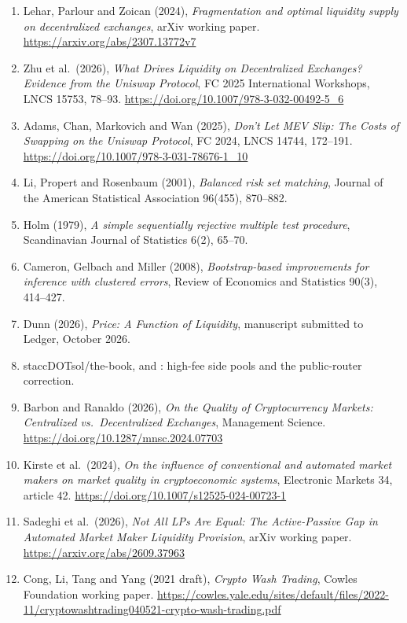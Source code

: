 \documentclass{ledger}
\begin{document}
\begin{enumerate}
\item Lehar, Parlour and Zoican (2024), \emph{Fragmentation and optimal liquidity supply on decentralized exchanges}, arXiv working paper. \url{https://arxiv.org/abs/2307.13772v7}
\item Zhu et al.\ (2026), \emph{What Drives Liquidity on Decentralized Exchanges? Evidence from the Uniswap Protocol}, FC 2025 International Workshops, LNCS 15753, 78--93. \url{https://doi.org/10.1007/978-3-032-00492-5_6}
\item Adams, Chan, Markovich and Wan (2025), \emph{Don't Let MEV Slip: The Costs of Swapping on the Uniswap Protocol}, FC 2024, LNCS 14744, 172--191. \url{https://doi.org/10.1007/978-3-031-78676-1_10}
\item Li, Propert and Rosenbaum (2001), \emph{Balanced risk set matching}, Journal of the American Statistical Association 96(455), 870--882.
\item Holm (1979), \emph{A simple sequentially rejective multiple test procedure}, Scandinavian Journal of Statistics 6(2), 65--70.
\item Cameron, Gelbach and Miller (2008), \emph{Bootstrap-based improvements for inference with clustered errors}, Review of Economics and Statistics 90(3), 414--427.
\item Dunn (2026), \emph{Price: A Function of Liquidity}, manuscript submitted to Ledger, October 2026.
\item staccDOTsol/the-book,  and : high-fee side pools and the public-router correction.
\item Barbon and Ranaldo (2026), \emph{On the Quality of Cryptocurrency Markets: Centralized vs.\ Decentralized Exchanges}, Management Science. \url{https://doi.org/10.1287/mnsc.2024.07703}
\item Kirste et al.\ (2024), \emph{On the influence of conventional and automated market makers on market quality in cryptoeconomic systems}, Electronic Markets 34, article 42. \url{https://doi.org/10.1007/s12525-024-00723-1}
\item Sadeghi et al.\ (2026), \emph{Not All LPs Are Equal: The Active-Passive Gap in Automated Market Maker Liquidity Provision}, arXiv working paper. \url{https://arxiv.org/abs/2609.37963}
\item Cong, Li, Tang and Yang (2021 draft), \emph{Crypto Wash Trading}, Cowles Foundation working paper. \url{https://cowles.yale.edu/sites/default/files/2022-11/cryptowashtrading040521-crypto-wash-trading.pdf}
\end{enumerate}
\end{document}
